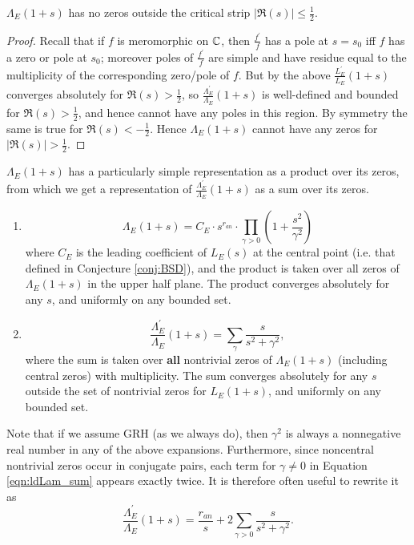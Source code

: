 \documentclass[10pt]{article}
\newcommand{\pr}{^{\prime}}
\newcommand{\Les}{L_E(s)}
\newcommand{\ldLe}[1]{\frac{L_E\pr}{L_E}\left(#1\right)}
\newcommand{\ldLam}[1]{\frac{\Lambda_E\pr}{\Lambda_E}\left(#1\right)}
\begin{document}
\begin{corollary}
$\Lambda_E(1+s)$ has no zeros outside the critical strip $|\Re(s)| \le \frac{1}{2}$.
\end{corollary}
\begin{proof}
Recall that if $f$ is meromorphic on $\mathbb{C}$, then $\frac{f\pr}{f}$ has a pole at $s=s_0$ iff $f$ has a zero or pole at $s_0$; moreover poles of $\frac{f\pr}{f}$ are simple and have residue equal to the multiplicity of the corresponding zero/pole of $f$. But by the above $\ldLe{1+s}$ converges absolutely for $\Re(s)>\frac{1}{2}$, so $\ldLam{1+s}$ is well-defined and bounded for $\Re(s)>\frac{1}{2}$, and hence cannot have any poles in this region. By symmetry the same is true for $\Re(s)<-\frac{1}{2}$. Hence $\Lambda_E(1+s)$ cannot have any zeros for $|\Re(s)| > \frac{1}{2}$.
\end{proof}

$\Lambda_E(1+s)$ has a particularly simple representation as a product over its zeros, from which we get a representation of $\ldLam{1+s}$ as a sum over its zeros.
\begin{proposition}\label{prop:logderiv_zero_rep}  \mbox{}
\begin{enumerate}
\item \begin{equation}\label{eqn:Lams_prod}
\Lambda_E(1+s) = C_E\cdot s^{r_{an}} \cdot \prod_{\gamma > 0} \left(1+\frac{s^2}{\gamma^2}\right) 
\end{equation}
where $C_E$ is the leading coefficient of $\Les$ at the central point (i.e. that defined in Conjecture \ref{conj:BSD}), and the product is taken over all zeros of $\Lambda_E(1+s)$ in the upper half plane. The product converges absolutely for any $s$, and uniformly on any bounded set.
\item \begin{equation}\label{eqn:ldLam_sum}
\ldLam{1+s} = \sum_{\gamma} \frac{s}{s^2+\gamma^2}, 
\end{equation}
where the sum is taken over {\bf all} nontrivial zeros of $\Lambda_E(1+s)$ (including central zeros) with multiplicity. The sum converges absolutely for any $s$ outside the set of nontrivial zeros for $L_E(1+s)$, and uniformly on any bounded set. \\
\end{enumerate}
\end{proposition}

Note that if we assume GRH (as we always do), then $\gamma^2$ is always a nonnegative real number in any of the above expansions. Furthermore,  since noncentral nontrivial zeros occur in conjugate pairs, each term for $\gamma \ne 0$ in Equation \ref{eqn:ldLam_sum} appears exactly twice. It is therefore often useful to rewrite it as
\begin{equation}\label{eqn:ldLam_sum_v2}
\ldLam{1+s} = \frac{r_{an}}{s} + 2 \sum_{\gamma>0} \frac{s}{s^2+\gamma^2}.
\end{equation}
\end{document}
